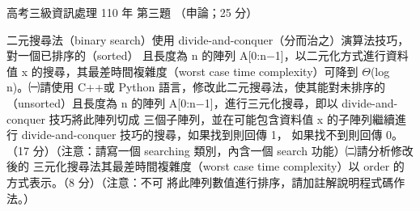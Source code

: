 \begin{pastexam}[label={px:gk3-110-ds-03}]{高考三級資訊處理 110 年 第三題}
（申論；25 分）

二元搜尋法（binary search）使用 divide-and-conquer（分而治之）演算法技巧，對一個已排序的（sorted）
且長度為 n 的陣列 A[0:n$-$1]，以二元化方式進行資料值 x 的搜尋，其最差時間複雜度（worst case time
complexity）可降到 $\Theta$(log n)。㈠請使用 C++或 Python 語言，修改此二元搜尋法，使其能對未排序的
（unsorted）且長度為 n 的陣列 A[0:n$-$1]，進行三元化搜尋，即以 divide-and-conquer 技巧將此陣列切成
三個子陣列，並在可能包含資料值 x 的子陣列繼續進行 divide-and-conquer 技巧的搜尋，如果找到則回傳 1，
如果找不到則回傳 0。（17 分）（注意：請寫一個 searching 類別，內含一個 search 功能）㈡請分析修改後的
三元化搜尋法其最差時間複雜度（worst case time complexity）以 order 的方式表示。（8 分）（注意：不可
將此陣列數值進行排序，請加註解說明程式碼作法。）
\end{pastexam}


